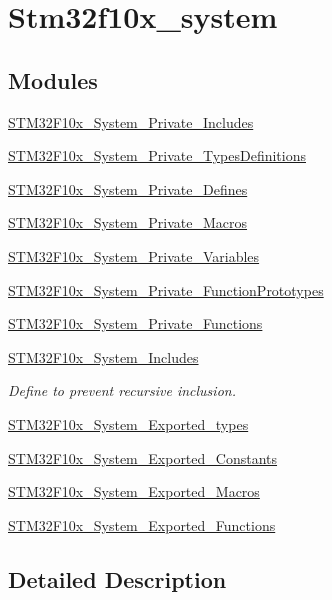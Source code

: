 \hypertarget{group__stm32f10x__system}{\section{Stm32f10x\-\_\-system}
\label{group__stm32f10x__system}
}
\subsection*{Modules}
\begin{DoxyCompactItemize}
\item 
\hyperlink{group___s_t_m32_f10x___system___private___includes}{S\-T\-M32\-F10x\-\_\-\-System\-\_\-\-Private\-\_\-\-Includes}
\item 
\hyperlink{group___s_t_m32_f10x___system___private___types_definitions}{S\-T\-M32\-F10x\-\_\-\-System\-\_\-\-Private\-\_\-\-Types\-Definitions}
\item 
\hyperlink{group___s_t_m32_f10x___system___private___defines}{S\-T\-M32\-F10x\-\_\-\-System\-\_\-\-Private\-\_\-\-Defines}
\item 
\hyperlink{group___s_t_m32_f10x___system___private___macros}{S\-T\-M32\-F10x\-\_\-\-System\-\_\-\-Private\-\_\-\-Macros}
\item 
\hyperlink{group___s_t_m32_f10x___system___private___variables}{S\-T\-M32\-F10x\-\_\-\-System\-\_\-\-Private\-\_\-\-Variables}
\item 
\hyperlink{group___s_t_m32_f10x___system___private___function_prototypes}{S\-T\-M32\-F10x\-\_\-\-System\-\_\-\-Private\-\_\-\-Function\-Prototypes}
\item 
\hyperlink{group___s_t_m32_f10x___system___private___functions}{S\-T\-M32\-F10x\-\_\-\-System\-\_\-\-Private\-\_\-\-Functions}
\item 
\hyperlink{group___s_t_m32_f10x___system___includes}{S\-T\-M32\-F10x\-\_\-\-System\-\_\-\-Includes}
\begin{DoxyCompactList}\small\item\em Define to prevent recursive inclusion. \end{DoxyCompactList}\item 
\hyperlink{group___s_t_m32_f10x___system___exported__types}{S\-T\-M32\-F10x\-\_\-\-System\-\_\-\-Exported\-\_\-types}
\item 
\hyperlink{group___s_t_m32_f10x___system___exported___constants}{S\-T\-M32\-F10x\-\_\-\-System\-\_\-\-Exported\-\_\-\-Constants}
\item 
\hyperlink{group___s_t_m32_f10x___system___exported___macros}{S\-T\-M32\-F10x\-\_\-\-System\-\_\-\-Exported\-\_\-\-Macros}
\item 
\hyperlink{group___s_t_m32_f10x___system___exported___functions}{S\-T\-M32\-F10x\-\_\-\-System\-\_\-\-Exported\-\_\-\-Functions}
\end{DoxyCompactItemize}


\subsection{Detailed Description}
